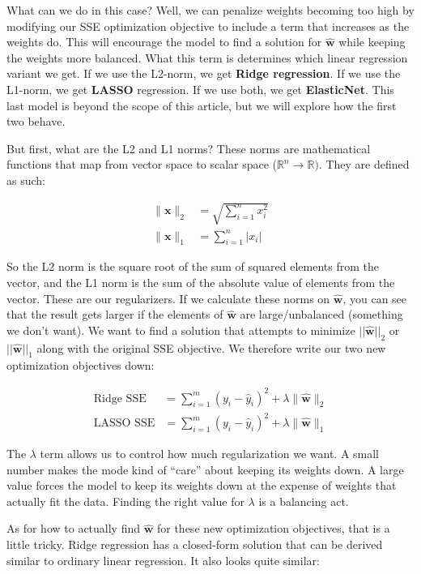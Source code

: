     What can we do in this case? Well, we can penalize weights becoming too high by modifying our SSE optimization objective to include a term that increases as the weights do. This will encourage the model to find a solution for $\hat{\textbf{w}}$ while keeping the weights more balanced. What this term is determines which linear regression variant we get. If we use the L2-norm, we get \textbf{Ridge regression}. If we use the L1-norm, we get \textbf{LASSO} regression. If we use both, we get \textbf{ElasticNet}. This last model is beyond the scope of this article, but we will explore how the first two behave.

    But first, what are the L2 and L1 norms? These norms are mathematical functions that map from vector space to scalar space ($\mathbb{R}^n \rightarrow \mathbb{R})$. They are defined as such:

    \begin{align*}
      \|\textbf{x}\|_2 &= \sqrt{\sum_{i=1}^n x_i^2} \\
      \|\textbf{x}\|_1 &= \sum_{i=1}^n \vert x_i \vert
    \end{align*}

    So the L2 norm is the square root of the sum of squared elements from the vector, and the L1 norm is the sum of the absolute value of elements from the vector. These are our regularizers. If we calculate these norms on $\hat{\textbf{w}}$, you can see that the result gets larger if the elements of $\hat{\textbf{w}}$ are large/unbalanced (something we don't want). We want to find a solution that attempts to minimize $||\hat{\textbf{w}}||_2$ or $||\hat{\textbf{w}}||_1$ along with the original SSE objective. We therefore write our two new optimization objectives down:

    \begin{align*}
      \text{Ridge SSE} &= \sum_{i=1}^{m} (y_i - \hat{y}_i)^2 + \lambda\|\hat{\textbf{w}}\|_2 \\
      \text{LASSO SSE} &= \sum_{i=1}^{m} (y_i - \hat{y}_i)^2 + \lambda\|\hat{\textbf{w}}\|_1
    \end{align*}

    The $\lambda$ term allows us to control how much regularization we want. A small number makes the mode kind of ``care'' about keeping its weights down. A large value forces the model to keep its weights down at the expense of weights that actually fit the data. Finding the right value for $\lambda$ is a balancing act.

    As for how to actually find $\hat{\textbf{w}}$ for these new optimization objectives, that is a little tricky. Ridge regression has a closed-form solution that can be derived similar to ordinary linear regression. It also looks quite similar:


